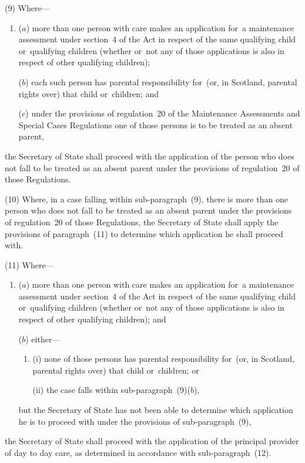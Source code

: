 \documentclass[a4paper,12pt]{article}
\begin{document}
(9) Where—
\begin{enumerate}\item[]
($a$) more than one person with care makes an application for~a maintenance assessment under section~4 of the Act in respect of the same qualifying child or~qualifying children (whether or~not any of those applications is also in respect of other qualifying children);

\begin{sloppypar}
($b$) each such person has parental responsibility for~(or, in Scotland, parental rights over) that child or~children; and
\end{sloppypar}

($c$) under the provisions of regulation~20 of the Maintenance Assessments and Special Cases Regulations one of those persons is to be treated as an absent parent,
\end{enumerate}
the Secretary of State  %
shall proceed with the application of the person who does not fall to be treated as an absent parent under the provisions of regulation~20 of those Regulations.

\begin{sloppypar}
(10) Where, in a case falling within sub-paragraph~(9), there is more than one person who does not fall to be treated as an absent parent under the provisions of regulation~20 of those Regulations, 
the Secretary of State  %
shall apply the provisions of paragraph~(11) to determine which application he shall proceed with.
\end{sloppypar}

(11) Where—
\begin{enumerate}\item[]
($a$) more than one person with care makes an application for~a maintenance assessment under section~4 of the Act in respect of the same qualifying child or~qualifying children (whether or~not any of those applications is also in respect of other qualifying children); and

($b$) either—
\begin{enumerate}\item[]
(i) none of those persons has parental responsibility for~(or, in Scotland, parental rights over) that child or~children; or

(ii) the case falls within sub-paragraph~(9)($b$),
\end{enumerate}
but 
the Secretary of State  %
has not been able to determine which application he is to proceed with under the provisions of sub-paragraph~(9),
\end{enumerate}
the Secretary of State  %
shall proceed with the application of the principal provider of day to day care, as determined in accordance with sub-paragraph~(12).
\end{document}
